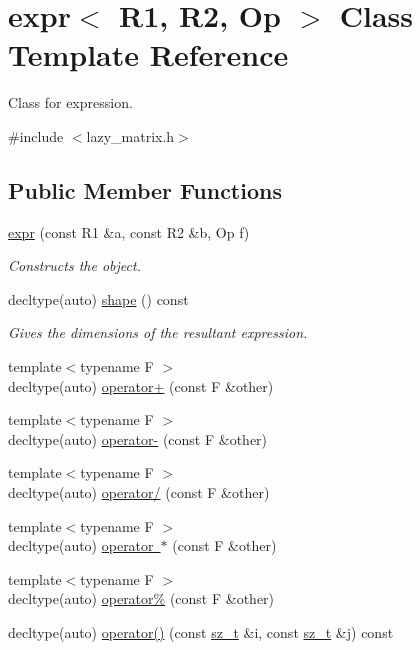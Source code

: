 \hypertarget{classexpr}{}\section{expr$<$ R1, R2, Op $>$ Class Template Reference}
\label{classexpr}


Class for expression.  




{\ttfamily \#include $<$lazy\+\_\+matrix.\+h$>$}

\subsection*{Public Member Functions}
\begin{DoxyCompactItemize}
\item 
\mbox{\hyperlink{classexpr_a88ac75b254c2838f389ad61101abb7f4}{expr}} (const R1 \&a, const R2 \&b, Op f)
\begin{DoxyCompactList}\small\item\em Constructs the object. \end{DoxyCompactList}\item 
decltype(auto) \mbox{\hyperlink{classexpr_aa61617d3e742a72e3ebbe3e289c32818}{shape}} () const
\begin{DoxyCompactList}\small\item\em Gives the dimensions of the resultant expression. \end{DoxyCompactList}\item 
{\footnotesize template$<$typename F $>$ }\\decltype(auto) \mbox{\hyperlink{classexpr_a252251779aa235aed7a5a7fec6ebe995}{operator+}} (const F \&other)
\item 
{\footnotesize template$<$typename F $>$ }\\decltype(auto) \mbox{\hyperlink{classexpr_ab46b7e78ad487b606b12e81c24cb3eeb}{operator-\/}} (const F \&other)
\item 
{\footnotesize template$<$typename F $>$ }\\decltype(auto) \mbox{\hyperlink{classexpr_abf2a263cd1346fe818d886cdc94ae4d0}{operator/}} (const F \&other)
\item 
{\footnotesize template$<$typename F $>$ }\\decltype(auto) \mbox{\hyperlink{classexpr_a7a78d4cfe0e97d19946a2ffb80882978}{operator $\ast$}} (const F \&other)
\item 
{\footnotesize template$<$typename F $>$ }\\decltype(auto) \mbox{\hyperlink{classexpr_abb42fe3353cc4446cf4cdae9e51ecb63}{operator\%}} (const F \&other)
\item 
decltype(auto) \mbox{\hyperlink{classexpr_a095b81efbf9ed48db95750cd726460a2}{operator()}} (const \mbox{\hyperlink{lazy__matrix_8h_acba2745dcfc55b2d05ff45adc6a0a015}{sz\+\_\+t}} \&i, const \mbox{\hyperlink{lazy__matrix_8h_acba2745dcfc55b2d05ff45adc6a0a015}{sz\+\_\+t}} \&j) const
\end{DoxyCompactItemize}
